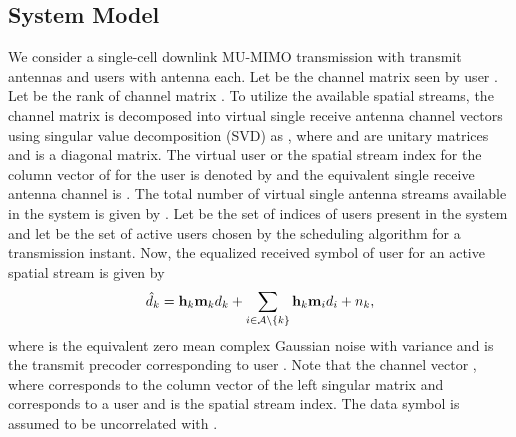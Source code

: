 \documentclass[conference,letterpaper,9pt]{./../IEEEtran}
\begin{document}
\subsection{System Model}
We consider a single-cell downlink \ac{MU-MIMO} transmission with  transmit antennas and  users with  antenna each. Let  be the channel matrix seen by user . Let  be the rank of channel matrix . To utilize the available spatial streams, the channel matrix  is decomposed into  virtual single receive antenna channel vectors using singular value decomposition (SVD) as , where  and  are unitary matrices and  is a diagonal matrix. The virtual user or the spatial stream index for the  column vector of  for the  user is denoted by  and the equivalent single receive antenna channel is . The total number of virtual single antenna streams available in the system is given by . Let  be the set of indices of users present in the system and let  be the set of active users chosen by the scheduling algorithm for a transmission instant. Now, the equalized received symbol  of user  for an active spatial stream is given by
\begin{equation}
	\hat{d}_k = \mathbf{h}_{k} \mathbf{m}_{k} d_k + \sum_{i \in \mathcal{A} \backslash \{k\}} \mathbf{h}_{k} \mathbf{m}_{i} d_i + {n}_{k},
\end{equation}
where  is the equivalent zero mean complex Gaussian noise with variance  and  is the transmit precoder corresponding to user . Note that the channel vector , where  corresponds to the  column vector of the left singular matrix  and  corresponds to a user and  is the spatial stream index. The data symbol  is assumed to be uncorrelated with .
\end{document}
